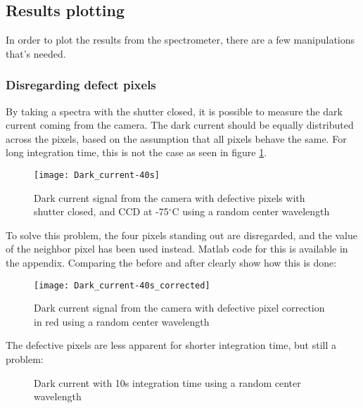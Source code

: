 \subsection{Results plotting}

In order to plot the results from the spectrometer, there are a few manipulations that's needed.

\subsubsection{Disregarding defect pixels}

By taking a spectra with the shutter closed, it is possible to measure the dark current coming from the camera. The dark current should be equally distributed across the pixels, based on the assumption that all pixels behave the same. For long integration time, this is not the case as seen in figure \ref{fig:dark_current_40s}.

\begin{figure}[H]
\centering
\texttt{[image: Dark\_current-40s]}
\caption[Defective pixels]{Dark current signal from the camera with defective pixels with shutter closed, and CCD at -75$^\circ$C using a random center wavelength}%
\label{fig:dark_current_40s}%
\end{figure}

To solve this problem, the four pixels standing out are disregarded, and the value of the neighbor pixel has been used instead. Matlab code for this is available in the appendix. Comparing the before and after clearly show how this is done:

\begin{figure}[H]
\centering
\texttt{[image: Dark\_current-40s\_corrected]}
\caption[Defective pixels corrected]{Dark current signal from the camera with defective pixel correction in red using a random center wavelength}%
\label{fig:dark_current_40s-corrected}%
\end{figure}

The defective pixels are less apparent for shorter integration time, but still a problem:

\begin{figure}[H]
\centering
{}
\label{fig:dark_current_correction_10s-parentfig}
\caption[Dark current with 10s integration time]{Dark current with 10s integration time using a random center wavelength}
\end{figure}

